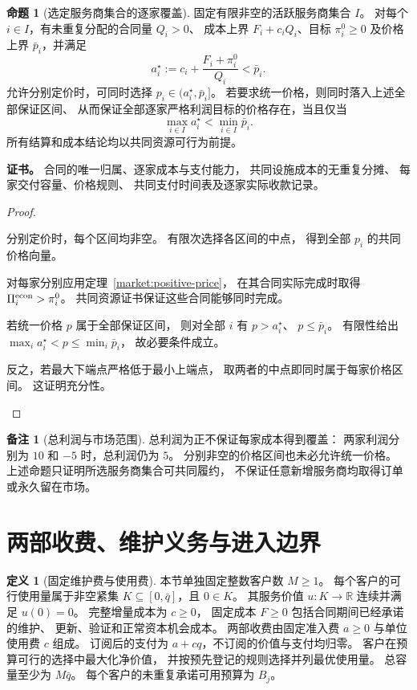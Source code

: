\documentclass[UTF8,12pt,a4paper,openany,fontset=none,zihao=false]{ctexrep}
\theoremstyle{definition}
\newtheorem{definition}{定义}[chapter]
\newtheorem{proposition}{命题}[chapter]
\newtheorem{remark}{备注}[chapter]
\newenvironment{certificate}{\par\noindent\textbf{证书。}\ignorespaces}{\par}
\newcommand{\RR}{\mathbb R}
\newcommand{\1}{\mathbf 1}
\begin{document}
\begin{proposition}[选定服务商集合的逐家覆盖]
\label{market:each-provider}
固定有限非空的活跃服务商集合 \(I\)。
对每个 \(i\in I\)，有未重复分配的合同量 \(Q_i>0\)、
成本上界 \(F_i+c_iQ_i\)、目标 \(\pi_i^0\ge0\)
及价格上界 \(\bar p_i\)，并满足
\[
 a_i^\star:=c_i+\frac{F_i+\pi_i^0}{Q_i}<\bar p_i.
\]
允许分别定价时，可同时选择
\(p_i\in(a_i^\star,\bar p_i]\)。
若要求统一价格，则同时落入上述全部保证区间、
从而保证全部逐家严格利润目标的价格存在，当且仅当
\[
 \max_{i\in I}a_i^\star<\min_{i\in I}\bar p_i.
\]
所有结算和成本结论均以共同资源可行为前提。
\end{proposition}
\begin{certificate}
合同的唯一归属、逐家成本与支付能力，
共同设施成本的无重复分摊、
每家交付容量、价格规则、
共同支付时间表及逐家实际收款记录。
\end{certificate}
\begin{proof}
\begin{semanticsteps}
\item 分别定价时，每个区间均非空。
有限次选择各区间的中点，
得到全部 \(p_i\) 的共同价格向量。
\item 对每家分别应用定理~\ref{market:positive-price}，
在其合同实际完成时取得
\(\Pi_i^{\rm econ}>\pi_i^0\)。
共同资源证书保证这些合同能够同时完成。
\item 若统一价格 \(p\) 属于全部保证区间，
则对全部 \(i\) 有 \(p>a_i^\star\)、
\(p\le\bar p_i\)。
有限性给出
\(\max_i a_i^\star<p\le\min_i\bar p_i\)，
故必要条件成立。
\item 反之，若最大下端点严格低于最小上端点，
取两者的中点即同时属于每家价格区间。
这证明充分性。
\end{semanticsteps}
\end{proof}

\begin{remark}[总利润与市场范围]
总利润为正不保证每家成本得到覆盖：
两家利润分别为 \(10\) 和 \(-5\) 时，总利润仍为 \(5\)。
分别非空的价格区间也未必允许统一价格。
上述命题只证明所选服务商集合可共同履约，
不保证任意新增服务商均取得订单或永久留在市场。
\end{remark}

\section{两部收费、维护义务与进入边界}

\begin{definition}[固定维护费与使用费]
\label{market:two-part-data}
本节单独固定整数客户数 \(M\ge1\)。
每个客户的可行使用量属于非空紧集
\(K\subseteq[0,\bar q]\)，且 \(0\in K\)。
其服务价值 \(u:K\to\RR\) 连续并满足 \(u(0)=0\)。
完整增量成本为 \(c\ge0\)，
固定成本 \(F\ge0\) 包括合同期间已经承诺的维护、
更新、验证和正常资本机会成本。
两部收费由固定准入费 \(a\ge0\) 与单位使用费 \(c\) 组成。
订阅后的支付为 \(a+cq\)，不订阅的价值与支付均归零。
客户在预算可行的选择中最大化净价值，
并按预先登记的规则选择并列最优使用量。
总容量至少为 \(M\bar q\)。
每个客户的未重复承诺可用预算为 \(B_j\)。
\end{definition}
\end{document}
